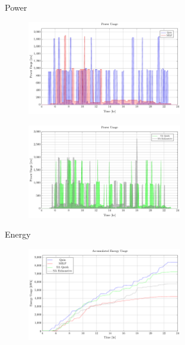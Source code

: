 \documentclass[aspectratio=169]{beamer}
\begin{document}
\begin{frame}[label={sec:orgd77b136}]{Power}
\begin{figure}[htpb]
\centering
    \includegraphics[width=0.6\textwidth]{img/sa-pap-paper-bad/power-milp-qin}
\end{figure}
\begin{figure}[htpb]
\centering
    \includegraphics[width=0.6\textwidth]{img/sa-pap-paper-bad/power-sa}
\end{figure}
\end{frame}
\begin{frame}[label={sec:org9eb178c}]{Energy}
\begin{figure}[htpb]
\centering
    \includegraphics[width=0.6\textwidth]{img/sa-pap-paper-bad/energy}
\end{figure}
\end{frame}
\end{document}
